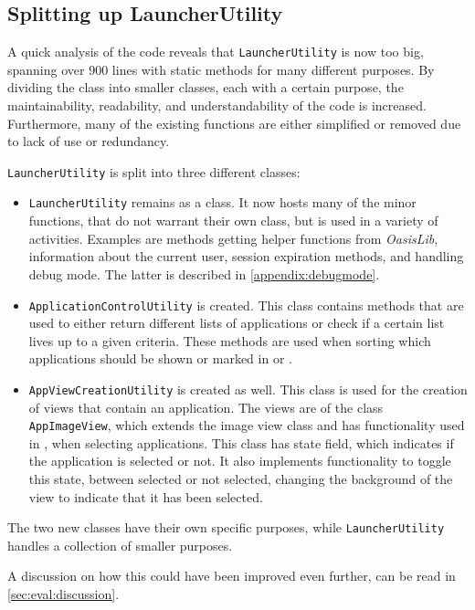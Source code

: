 \subsection{Splitting up LauncherUtility}\label{sect:sprint4:refactoring}

A quick analysis of the code reveals that \lstinline|LauncherUtility| is now too big, spanning over 900 lines with static methods for many different purposes.
By dividing the class into smaller classes, each with a certain purpose, the maintainability, readability, and understandability of the code is increased.
Furthermore, many of the existing functions are either simplified or removed due to lack of use or redundancy.

\lstinline|LauncherUtility| is split into three different classes:

\begin{itemize}
\item \lstinline|LauncherUtility| remains as a class.
It now hosts many of the minor functions, that do not warrant their own class, but is used in a variety of activities.
Examples are methods getting helper functions from \textit{OasisLib}, information about the current user, session expiration methods, and handling debug mode.
The latter is described in \cref{appendix:debugmode}.
\item \lstinline|ApplicationControlUtility| is created.
This class contains methods that are used to either return different lists of applications or check if a certain list lives up to a given criteria.
These methods are used when sorting which applications should be shown or marked in \settingsactivity or \homeactivity.
\item \lstinline|AppViewCreationUtility| is created as well.
This class is used for the creation of views that contain an application.
The views are of the class \lstinline|AppImageView|, which extends the image view class and has functionality used in \settingsactivity, when selecting applications. 
This class has state field, which indicates if the application is selected or not. 
It also implements functionality to toggle this state, between selected or not selected, changing the background of the view to indicate that it has been selected.
\end{itemize}

The two new classes have their own specific purposes, while \lstinline|LauncherUtility| handles a collection of smaller purposes.

A discussion on how this could have been improved even further, can be read in \cref{sec:eval:discussion}.